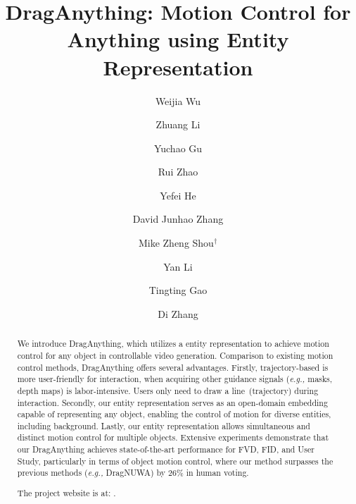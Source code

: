 \documentclass[runningheads]{llncs}
\def\eg{\emph{e.g.,}}
\newcommand{\ours}{\textup{DragAnything}\xspace}
\begin{document}
\title{\ours: Motion Control for Anything using Entity Representation}



\author{Weijia Wu
\and
Zhuang Li \and
Yuchao Gu \and
Rui Zhao \and
Yefei He  \and
David Junhao Zhang
\and Mike Zheng Shou$^\dagger$
\and
Yan Li \and
Tingting Gao
\and Di Zhang
}





\maketitle


\begin{abstract}
  We introduce \ours, which utilizes a entity representation to achieve motion control for any object in controllable video generation.
  Comparison to existing motion control methods, \ours offers several advantages. 
  Firstly, trajectory-based is more user-friendly for interaction, when acquiring other guidance signals (\eg{} masks, depth maps) is labor-intensive. 
  Users only need to draw a line~(trajectory) during interaction.
  Secondly, our entity representation serves as an open-domain embedding capable of representing any object, enabling the control of motion for diverse entities, including background.
  Lastly, our entity representation allows simultaneous and distinct motion control for multiple objects.
  Extensive experiments demonstrate that our \ours achieves state-of-the-art performance for FVD, FID, and User Study, particularly in terms of object motion control, where our method surpasses the previous methods (\eg{} DragNUWA) by $26\%$ in human voting.

  The project website is at:  
   \href{https://weijiawu.github.io/draganything_page/}{\color{blue}{\tt DragAnything}}.
   
  
  
  
\end{abstract}
\end{document}
